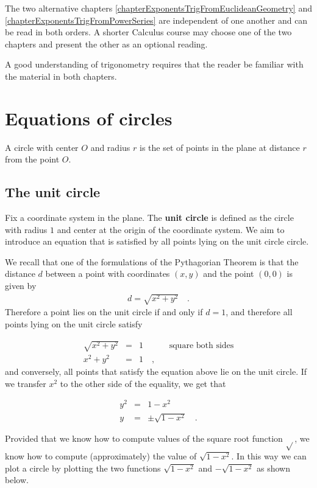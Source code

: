 \documentclass[12pt]{book}
\renewcommand{\emph}{\textbf}
\begin{document}
The two alternative chapters \ref{chapterExponentsTrigFromEuclideanGeometry} and \ref{chapterExponentsTrigFromPowerSeries} are independent of one another and can be read in both orders. A shorter Calculus course may choose one of the two chapters and present the other as an optional reading.

A good understanding of trigonometry requires that the reader be familiar with the material in both chapters. 

\section{Equations of circles}\label{secCircleEquation}
A circle with center $O$ and radius $r$ is the set of points in the plane at distance $ r$ from the point $O$. 

\subsection{The unit circle}
Fix a coordinate system in the plane. The \emph{unit circle} is defined as the circle with radius $1$ and center at the origin of the coordinate system. We aim to introduce an equation that is satisfied by all points lying on the unit circle circle.

We recall that one of the formulations of the Pythagorian Theorem is that the distance $d$ between a point with coordinates $(x,y)$ and the point $(0,0)$ is given by
\[
\begin{array}{rcl}
d= \sqrt{x^2+y^2}\quad .
\end{array}
\]
Therefore a point lies on the unit circle if and only if $d=1$, and therefore all points lying on the unit circle satisfy

\[
\begin{array}{rcll|l}
\sqrt{x^2+y^2}&=&1&&\text{square both sides}\\
x^2+y^2&=&1\quad ,
\end{array}
\]
and conversely, all points that satisfy the equation above lie on the unit circle. If we transfer $x^2$ to the other side of the equality, we get that

\[
\begin{array}{rcll|l}
y^2&=&1-x^2\\
y&=&\pm \sqrt{1-x^2}\quad .
\end{array}
\]

Provided that we know how to compute values of the square root function $\sqrt{}$, we know how to compute (approximately) the value of $\sqrt{1-x^2}$. In this way we can plot a circle by plotting the two functions $\sqrt{1-x^2}$ and $-\sqrt{1-x^2}$ as shown below. 
\end{document}
